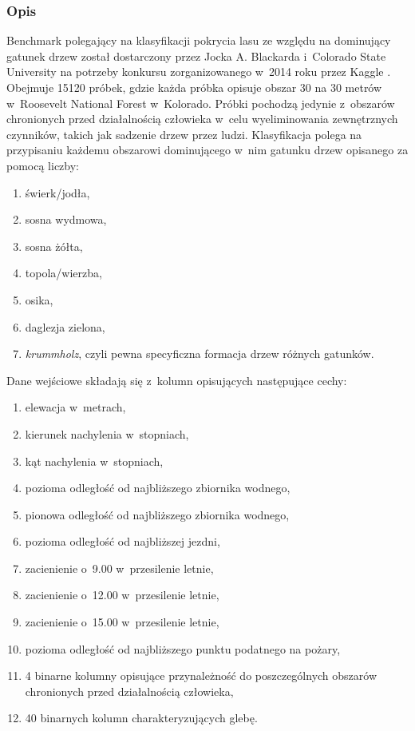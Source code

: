 \documentclass{article}
\begin{document}
\subsubsection{Opis}
Benchmark polegający na klasyfikacji pokrycia lasu ze względu na dominujący gatunek drzew został dostarczony przez Jocka A. Blackarda i~Colorado State University na potrzeby konkursu zorganizowanego w~2014 roku przez Kaggle \cite{forest_cover}. Obejmuje 15120 próbek, gdzie każda próbka opisuje obszar 30 na 30 metrów w~Roosevelt National Forest w~Kolorado. Próbki pochodzą jedynie z~obszarów chronionych przed działalnością człowieka w~celu wyeliminowania zewnętrznych czynników, takich jak sadzenie drzew przez ludzi. Klasyfikacja polega na przypisaniu każdemu obszarowi dominującego w~nim gatunku drzew opisanego za pomocą liczby:
\begin{enumerate}
\item świerk/jodła,
\item sosna wydmowa,
\item sosna żółta,
\item topola/wierzba,
\item osika,
\item daglezja zielona,
\item \textit{krummholz}, czyli pewna specyficzna formacja drzew różnych gatunków.
\end{enumerate}
Dane wejściowe składają się z~kolumn opisujących następujące cechy:
\begin{enumerate}
\item elewacja w~metrach,
\item kierunek nachylenia w~stopniach,
\item kąt nachylenia w~stopniach,
\item pozioma odległość od najbliższego zbiornika wodnego,
\item pionowa odległość od najbliższego zbiornika wodnego,
\item pozioma odległość od najbliższej jezdni,
\item zacienienie o~9.00 w~przesilenie letnie,
\item zacienienie o~12.00 w~przesilenie letnie,
\item zacienienie o~15.00 w~przesilenie letnie,
\item pozioma odległość od najbliższego punktu podatnego na pożary,
\item 4 binarne kolumny opisujące przynależność do poszczególnych obszarów chronionych przed działalnością człowieka,
\item 40 binarnych kolumn charakteryzujących glebę.
\end{enumerate}
\end{document}
